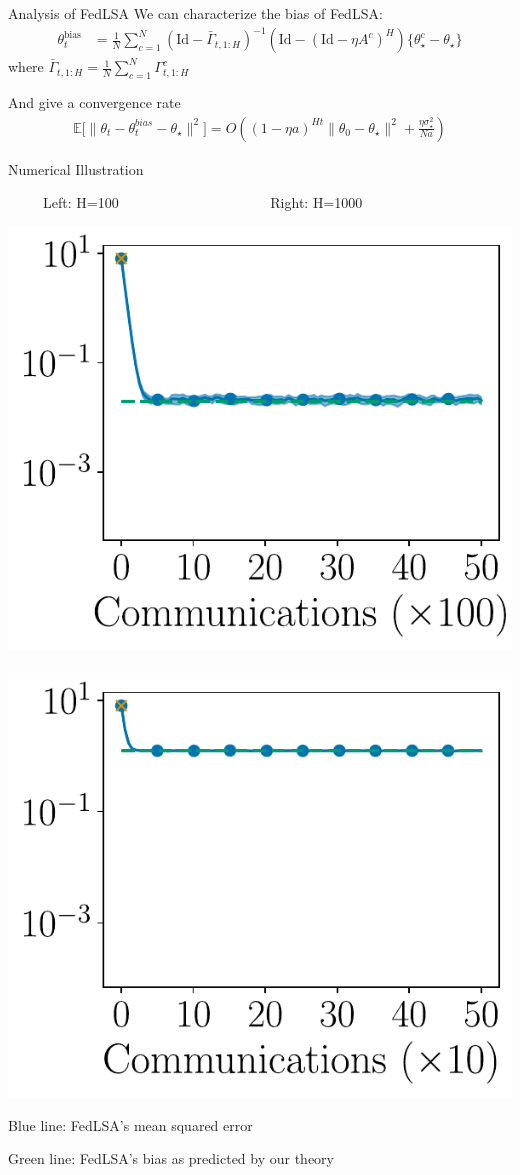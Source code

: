 \documentclass[aspectratio=169,14pt]{beamer}
\begin{document}
\begin{frame}{Analysis of FedLSA}
  We can characterize the bias of FedLSA:
  \begin{align*}
    \theta_t^{\text{bias}}
    & =
      \frac{1}{N}
      \sum_{c=1}^N
      (\text{Id} - \bar{\Gamma}_{t,1:H})^{-1} 
      (\text{Id} - (\text{Id}- \eta A^c)^H)\{ \theta_\star^c - \theta_\star \}
  \end{align*}
  where $\bar{\Gamma}_{t,1:H} = \tfrac{1}{N} \sum_{c=1}^N \Gamma_{t,1:H}^c$

  \pause

  \vspace{1em}
  
  And give a convergence rate
  \begin{align*}
    \mathbb{E} \Big[ \| {\theta_t - \theta^{bias}_{t} - \theta_\star} \|^2 \Big]
    =
    O\left(
    (1 - \eta a)^{H t} \| \theta_0 - \theta_\star \|^2
    + \frac{\eta \sigma_\star^2}{N a}
    \right)
  \end{align*}
\end{frame}


\begin{frame}{Numerical Illustration}
  \vspace{-0.5em}
  
  \begin{center}
    ~~~~~Left: H=100~~~~~~~~~~~~~~~~~~~~~
    Right: H=1000
 
    \vspace{-1em}
   
    \includegraphics[width=0.4\linewidth]{images/plot_hg_100_n100_fedlsa.pdf}
    ~~
    \includegraphics[width=0.4\linewidth]{images/plot_hg_1000_n100_fedlsa.pdf}
  \end{center}

  \vspace{-1em}

  Blue line: FedLSA's mean squared error

  \vspace{-1em}

  Green line: FedLSA's bias as predicted by our theory
\end{frame}
\end{document}
